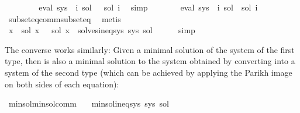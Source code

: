 \begin{isabellebody}
\ \ \ \ \isamarkupfalse%
\ \isamarkupfalse%
\ {\isachardoublequoteopen}{\isasymPsi}\ {\isacharparenleft}{\kern0pt}eval\ {\isacharparenleft}{\kern0pt}sys\ {\isacharbang}{\kern0pt}\ i{\isacharparenright}{\kern0pt}\ {\isacharquery}{\kern0pt}sol{\isacharprime}{\kern0pt}{\isacharparenright}{\kern0pt}\ {\isasymsubseteq}\ {\isasymPsi}\ {\isacharparenleft}{\kern0pt}sol\ i{\isacharparenright}{\kern0pt}{\isachardoublequoteclose}\ \isamarkupfalse%
\ simp\isanewline
\ \ \ \ \isamarkupfalse%
\ \isamarkupfalse%
\ {\isachardoublequoteopen}eval\ {\isacharparenleft}{\kern0pt}sys\ {\isacharbang}{\kern0pt}\ i{\isacharparenright}{\kern0pt}\ {\isacharquery}{\kern0pt}sol{\isacharprime}{\kern0pt}\ {\isasymsubseteq}\ {\isacharquery}{\kern0pt}sol{\isacharprime}{\kern0pt}\ i{\isachardoublequoteclose}\ \isamarkupfalse%
\ subseteq{\isacharunderscore}{\kern0pt}comm{\isacharunderscore}{\kern0pt}subseteq\ \isamarkupfalse%
\ metis\isanewline
\ \ \isamarkupfalse%
\isanewline
\ \ \isamarkupfalse%
\ \isamarkupfalse%
\ {\isachardoublequoteopen}{\isacharparenleft}{\kern0pt}{\isasymforall}x{\isachardot}{\kern0pt}\ {\isasymPsi}\ {\isacharparenleft}{\kern0pt}sol\ x{\isacharparenright}{\kern0pt}\ {\isacharequal}{\kern0pt}\ {\isasymPsi}\ {\isacharparenleft}{\kern0pt}{\isacharquery}{\kern0pt}sol{\isacharprime}{\kern0pt}\ x{\isacharparenright}{\kern0pt}{\isacharparenright}{\kern0pt}\ {\isasymand}\ solves{\isacharunderscore}{\kern0pt}ineq{\isacharunderscore}{\kern0pt}sys\ sys\ {\isacharquery}{\kern0pt}sol{\isacharprime}{\kern0pt}{\isachardoublequoteclose}\isanewline
\ \ \ \ \isamarkupfalse%
\ simp\isanewline
{}\isamarkupfalse%
%
\endisatagproof
{\isafoldproof}%
%
\isadelimproof
%
\endisadelimproof
%
\begin{isamarkuptext}%
The converse works similarly: Given a minimal solution  of the system  of the first type,
then  is also a minimal solution to the system obtained by converting  into a system of the second
type (which can be achieved by applying the Parikh image on both sides of each equation):%
\end{isamarkuptext}\isamarkuptrue%
\isamarkupfalse%
\ min{\isacharunderscore}{\kern0pt}sol{\isacharunderscore}{\kern0pt}min{\isacharunderscore}{\kern0pt}sol{\isacharunderscore}{\kern0pt}comm{\isacharcolon}{\kern0pt}\isanewline
\ \ \ {\isachardoublequoteopen}min{\isacharunderscore}{\kern0pt}sol{\isacharunderscore}{\kern0pt}ineq{\isacharunderscore}{\kern0pt}sys\ sys\ sol{\isachardoublequoteclose}\isanewline

\end{isabellebody}

